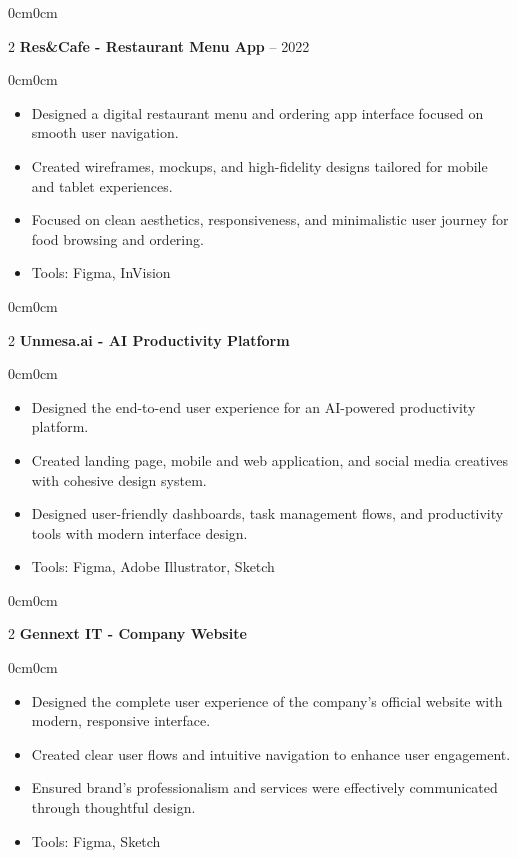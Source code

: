 \documentclass[10pt, letterpaper]{article}
\newenvironment{highlights}{\begin{itemize}[topsep=0.10 cm, parsep=0.10 cm, partopsep=0pt, itemsep=0pt, leftmargin=10pt]}{\end{itemize}}
\newenvironment{onecolentry}{\begin{adjustwidth}{0cm}{0cm}}{\end{adjustwidth}}
\newenvironment{twocolentry}[2][]{\onecolentry\def\secondColumn{#2}\setcolumnwidth{\fill, 4.5 cm}\begin{paracol}{2}}{\switchcolumn \raggedleft \secondColumn\end{paracol}\endonecolentry}
\begin{document}
\vspace{0.2cm}
\begin{twocolentry}{2021 -- 2022}
    \textbf{Res\&Cafe - Restaurant Menu App}
\end{twocolentry}
\vspace{0.2cm}
\begin{onecolentry}
    \begin{highlights}
        \item Designed a digital restaurant menu and ordering app interface focused on smooth user navigation.
        \item Created wireframes, mockups, and high-fidelity designs tailored for mobile and tablet experiences.
        \item Focused on clean aesthetics, responsiveness, and minimalistic user journey for food browsing and ordering.
        \item Tools: Figma, InVision
    \end{highlights}
\end{onecolentry}

\vspace{0.2cm}
\begin{twocolentry}{2021}
    \textbf{Unmesa.ai - AI Productivity Platform}
\end{twocolentry}
\vspace{0.2cm}
\begin{onecolentry}
    \begin{highlights}
        \item Designed the end-to-end user experience for an AI-powered productivity platform.
        \item Created landing page, mobile and web application, and social media creatives with cohesive design system.
        \item Designed user-friendly dashboards, task management flows, and productivity tools with modern interface design.
        \item Tools: Figma, Adobe Illustrator, Sketch
    \end{highlights}
\end{onecolentry}

\vspace{0.2cm}
\begin{twocolentry}{2024}
    \textbf{Gennext IT - Company Website}
\end{twocolentry}
\vspace{0.2cm}
\begin{onecolentry}
    \begin{highlights}
        \item Designed the complete user experience of the company's official website with modern, responsive interface.
        \item Created clear user flows and intuitive navigation to enhance user engagement.
        \item Ensured brand's professionalism and services were effectively communicated through thoughtful design.
        \item Tools: Figma, Sketch
    \end{highlights}
\end{onecolentry}
\end{document}
